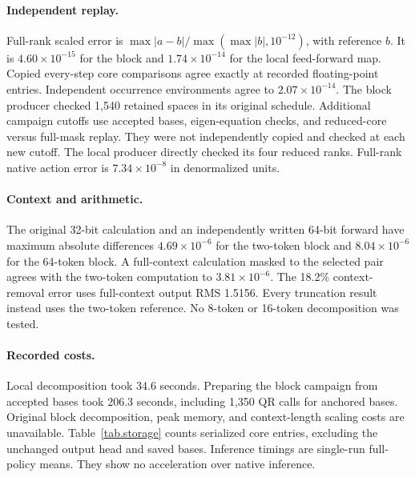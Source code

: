 \documentclass{article}
\begin{document}
\paragraph{Independent replay.}
Full-rank scaled error is $\max|a-b|/\max(\max|b|,10^{-12})$, with reference $b$. It is $4.60\times10^{-15}$ for the block and $1.74\times10^{-14}$ for the local feed-forward map. Copied every-step core comparisons agree exactly at recorded floating-point entries. Independent occurrence environments agree to $2.07\times10^{-14}$. The block producer checked 1,540 retained spaces in its original schedule. Additional campaign cutoffs use accepted bases, eigen-equation checks, and reduced-core versus full-mask replay. They were not independently copied and checked at each new cutoff. The local producer directly checked its four reduced ranks. Full-rank native action error is $7.34\times10^{-8}$ in denormalized units.

\paragraph{Context and arithmetic.}
The original 32-bit calculation and an independently written 64-bit forward have maximum absolute differences $4.69\times10^{-6}$ for the two-token block and $8.04\times10^{-6}$ for the 64-token block. A full-context calculation masked to the selected pair agrees with the two-token computation to $3.81\times10^{-6}$. The 18.2\% context-removal error uses full-context output RMS 1.5156. Every truncation result instead uses the two-token reference. No 8-token or 16-token decomposition was tested.

\paragraph{Recorded costs.}
Local decomposition took 34.6 seconds. Preparing the block campaign from accepted bases took 206.3 seconds, including 1,350 QR calls for anchored bases. Original block decomposition, peak memory, and context-length scaling costs are unavailable. Table~\ref{tab.storage} counts serialized core entries, excluding the unchanged output head and saved bases. Inference timings are single-run full-policy means. They show no acceleration over native inference.
\end{document}

